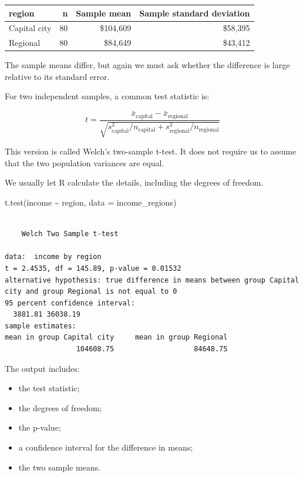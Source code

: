 \documentclass[
  letterpaper,
  DIV=11,
  numbers=noendperiod]{scrreprt}
\newenvironment{Shaded}{\begin{snugshade}}{\end{snugshade}}
\newcommand{\AttributeTok}[1]{\textcolor[rgb]{0.40,0.45,0.13}{#1}}
\newcommand{\FunctionTok}[1]{\textcolor[rgb]{0.28,0.35,0.67}{#1}}
\newcommand{\NormalTok}[1]{\textcolor[rgb]{0.00,0.23,0.31}{#1}}
\newcommand{\SpecialCharTok}[1]{\textcolor[rgb]{0.37,0.37,0.37}{#1}}
\providecommand{\tightlist}{%
  \setlength{\itemsep}{0pt}\setlength{\parskip}{0pt}}
\begin{document}
\begin{table}
\fontsize{12.0pt}{14.0pt}\selectfont
\begin{tabular*}{\linewidth}{@{\extracolsep{\fill}}lrrr}
\toprule
region & n & Sample mean & Sample standard deviation \\ 
\midrule\addlinespace[2.5pt]
Capital city & 80 & \$104,609 & \$58,395 \\ 
Regional & 80 & \$84,649 & \$43,412 \\ 
\bottomrule
\end{tabular*}
\end{table}

The sample means differ, but again we must ask whether the difference is
large relative to its standard error.

For two independent samples, a common test statistic is:

\[
t
=
\frac{\bar{x}_{\text{capital}} - \bar{x}_{\text{regional}}}
{\sqrt{s^2_{\text{capital}}/n_{\text{capital}} + s^2_{\text{regional}}/n_{\text{regional}}}}
\]

This version is called Welch's two-sample t-test. It does not require us
to assume that the two population variances are equal.

We usually let R calculate the details, including the degrees of
freedom.

\begin{Shaded}
\begin{Highlighting}[]
\FunctionTok{t.test}\NormalTok{(income }\SpecialCharTok{\textasciitilde{}}\NormalTok{ region, }\AttributeTok{data =}\NormalTok{ income\_regions)}
\end{Highlighting}
\end{Shaded}

\begin{verbatim}

    Welch Two Sample t-test

data:  income by region
t = 2.4535, df = 145.89, p-value = 0.01532
alternative hypothesis: true difference in means between group Capital city and group Regional is not equal to 0
95 percent confidence interval:
  3881.81 36038.19
sample estimates:
mean in group Capital city     mean in group Regional 
                 104608.75                   84648.75 
\end{verbatim}

The output includes:

\begin{itemize}
\tightlist
\item
  the test statistic;
\item
  the degrees of freedom;
\item
  the p-value;
\item
  a confidence interval for the difference in means;
\item
  the two sample means.
\end{itemize}
\end{document}
